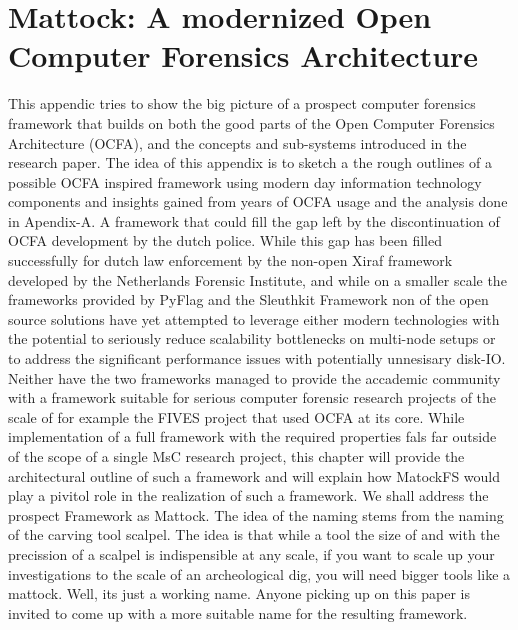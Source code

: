 \chapter{Mattock: A modernized Open Computer Forensics Architecture}
This appendic tries to show the big picture of a prospect computer forensics framework that builds on both the good parts of the Open Computer Forensics Architecture (OCFA), and the concepts and sub-systems introduced in the research paper. The idea of this appendix is to sketch a  the rough outlines of a possible OCFA inspired framework using modern day information technology components and insights gained from years of OCFA usage and the analysis done in Apendix-A. A framework that could fill the gap left by the discontinuation of OCFA development by the dutch police. While this gap has been filled successfully for dutch law enforcement by the non-open Xiraf framework developed by the Netherlands Forensic Institute, and while on a smaller scale the frameworks provided by PyFlag and the Sleuthkit Framework non of the open source solutions have yet attempted to leverage either modern technologies with the potential to seriously reduce scalability bottlenecks on multi-node setups or to address the significant performance issues with potentially unnesisary disk-IO. Neither have the two frameworks managed to provide the accademic community with a framework suitable for serious computer forensic research projects of the scale of for example the FIVES project that used OCFA at its core. While implementation of a full framework with the required properties fals far outside of the scope of a single MsC research project, this chapter will provide the architectural outline of such a framework and will explain how MatockFS would play a pivitol role in the realization of such a framework. We shall address the prospect Framework as Mattock. The idea of the naming stems from the naming of the carving tool scalpel. The idea is that while a tool the size of and with the precission of a scalpel is indispensible at any scale, if you want to scale up your investigations to the scale of an archeological dig, you will need bigger tools like a mattock. Well, its just a working name. Anyone picking up on this paper is invited to come up with a more suitable name for the resulting framework. 

